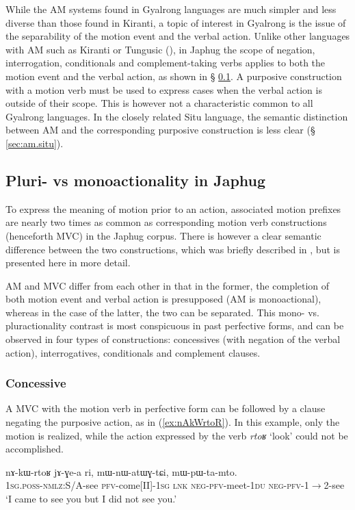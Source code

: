 \documentclass[oneside,a4paper,11pt]{article}
\newcommand{\japhug}[2]{\textit{\phon#1} `#2'}
\newcommand{\fl}{$\rightarrow$}
\begin{document}
While the AM systems found in Gyalrong languages are much simpler and less diverse than those found in Kiranti, a topic of interest in Gyalrong is the issue of the separability of the motion event and the verbal action. Unlike other languages with AM such as Kiranti or Tungusic (\citealt{stojnova16nda, fuente18am}), in Japhug the scope of negation, interrogation, conditionals and complement-taking verbs applies to both the motion event and the verbal action, as shown in § \ref{sec:am.japhug}. A purposive construction with a motion verb must be used to express cases when the verbal action is outside of their scope. This is however not a characteristic common to all Gyalrong languages. In the closely related Situ language, the semantic distinction between AM and the corresponding purposive construction is less clear (§ \ref{sec:am.situ}).

 \subsection{Pluri- vs monoactionality in Japhug} \label{sec:am.japhug}
To express the meaning of motion prior to an action, associated motion prefixes are nearly two times as common as corresponding motion verb constructions (henceforth MVC) in the Japhug corpus. There is however a clear semantic difference between the two constructions, which was briefly described in \citet{jacques13harmonization}, but is presented here in more detail.

AM and MVC differ from each other in that in the former, the completion of both motion event and verbal action is presupposed (AM is monoactional), whereas in the case of the latter, the two can be separated. This mono- vs. pluractionality contrast is most conspicuous in past perfective forms, and can be observed in four types of constructions: concessives (with negation of the verbal action), interrogatives, conditionals and complement clauses.

\subsubsection{Concessive} \label{sec:am.concessive}
A MVC  with the motion verb in perfective form can be followed by a clause negating the purposive action, as in (\ref{ex:nAkWrtoR}). In this example, only the motion is realized, while the action expressed by the verb \japhug{rtoʁ}{look} could not be accomplished.

\begin{exe}
\ex \label{ex:nAkWrtoR}
\gll nɤ-kɯ-rtoʁ jɤ-ɣe-a ri, mɯ-nɯ-atɯɣ-tɕi, mɯ-pɯ-ta-mto. \\
\textsc{1sg.poss}-\textsc{nmlz}:S/A-see \textsc{pfv}-come[II]-\textsc{1sg} \textsc{lnk} \textsc{neg}-\textsc{pfv}-meet-\textsc{1du} \textsc{neg}-\textsc{pfv}-1\fl2-see \\
\glt `I came to see you but I did not see you.' 
\end{exe}
\end{document}
